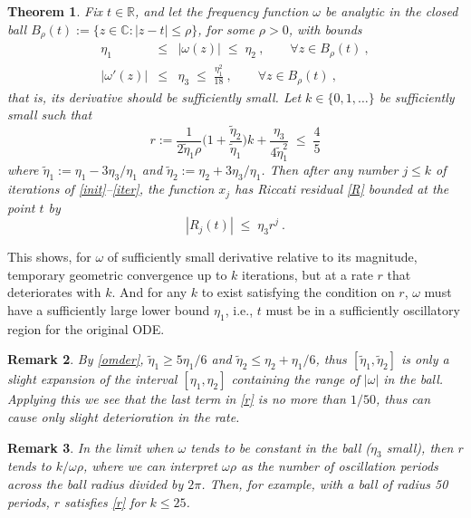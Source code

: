 \documentclass[10pt]{article}
\newcommand{\be}{\begin{equation}}
\newcommand{\ee}{\end{equation}}
\newcommand{\bea}{\begin{eqnarray}}
\newcommand{\eea}{\end{eqnarray}}
\newcommand{\C}{\mathbb{C}}
\newcommand{\R}{\mathbb{R}}
\newtheorem{thm}{Theorem}
\newtheorem{rmk}[thm]{Remark}
\newcommand{\om}{\omega}
\newcommand{\te}{\tilde\eta}
\begin{document}
\begin{thm}\label{t:R}
  Fix $t\in\R$, and let the frequency function $\om$ be analytic
  in the closed ball $B_\rho(t) := \{z\in\C : |z-t| \le \rho\}$,
  for some $\rho>0$, with bounds
  \bea
  \eta_1 &\le& |\om(z)| \;\le\; \eta_2~, \qquad \forall z\in B_\rho(t)~,
  \label{ommag} \\
  |\om'(z)| &\le& \eta_3 \;\le\; \frac{\eta_1^2}{18}~,
  \qquad \forall z\in B_\rho(t)~,
  \label{omder}
  \eea
  that is, its derivative should be sufficiently small.
  Let $k\in\{0,1,\dots\}$ be sufficiently small such that
  \be
  r := \frac{1}{2\te_1 \rho}
  \biggl(1 + \frac{\te_2}{\te_1}\biggr) k + \frac{\eta_3}{4\te_1^2}
  \; \le \; \frac{4}{5}
  \label{r}
  \ee
  where $\te_1:=\eta_1 - 3\eta_3/\eta_1$ and $\te_2:=\eta_2 + 3\eta_3/\eta_1$.
  Then after any number $j\le k$ of iterations of \eqref{init}--\eqref{iter},
  the function $x_j$ has Riccati residual \eqref{R} bounded at the point $t$ by
  \be
  |R_j(t)| \;\le\; \eta_3 r^j~.
  \label{Rjbnd}
  \ee
\end{thm}
This shows, for $\om$ of sufficiently small derivative
relative to its magnitude,
temporary geometric convergence up to $k$ iterations,
but at a rate $r$ that deteriorates with $k$.
And for any $k$ to exist satisfying the condition on $r$, $\om$ must have
a sufficiently large lower bound $\eta_1$, i.e., $t$
must be in a sufficiently oscillatory region for the original ODE.

\begin{rmk}\label{r:slight}
  By \eqref{omder}, $\te_1 \ge 5\eta_1/6$ and $\te_2 \le \eta_2 + \eta_1/6$,
  thus $[\te_1,\te_2]$ is only a slight
  expansion of the interval $[\eta_1,\eta_2]$ containing the range of
  $|\om|$ in the ball.
  Applying this we see that the last term in \eqref{r}
  is no more than $1/50$, thus can cause only slight deterioration in the rate.
\end{rmk}

\begin{rmk}
  In the limit when $\om$ tends to be constant in the ball ($\eta_3$ small),
  then $r$ tends to $k/\om \rho$, where we can interpret $\om\rho$ as
  the number of oscillation periods across the ball radius divided by $2\pi$.
  Then, for example, with a ball of radius 50 periods, $r$ satisfies \eqref{r}
  for $k\le 25$.
\end{rmk}
\end{document}
